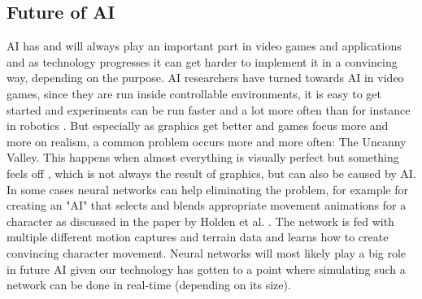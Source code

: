 \documentclass[a4paper]{article}
\begin{document}
\subsection{Future of AI}
AI has and will always play an important part in video games and applications and as technology progresses it can get harder to implement it in a convincing way, depending on the purpose. AI researchers have turned towards AI in video games, since they are run inside controllable environments, it is easy to get started and experiments can be run faster and a lot more often than for instance in robotics \cite{togelius}. But especially as graphics get better and games focus more and more on realism, a common problem occurs more and more often: The Uncanny Valley. This happens when almost everything is visually perfect but something feels off \cite{matthewcarrozo}, which is not always the result of graphics, but can also be caused by AI. In some cases neural networks can help eliminating the problem, for example for creating an "AI" that selects and blends appropriate movement animations for a character as discussed in the paper by Holden et al. \cite{nncc}. The network is fed with multiple different motion captures and terrain data and learns how to create convincing character movement.
Neural networks will most likely play a big role in future AI given our technology has gotten to a point where simulating such a network can be done in real-time (depending on its size).
\renewcommand{\refname}{\section{References and Further Sources}}
\end{document}

